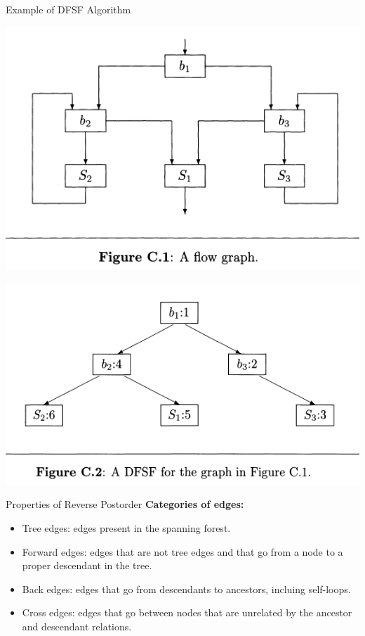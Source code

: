 \documentclass[aspectratio=1610, 13pt]{beamer}
\begin{document}
\begin{frame}{Example of DFSF Algorithm}
\begin{center}
\includegraphics[scale=0.33]{dfsf1.png}

\includegraphics[scale=0.33]{dfsf2.png}
\end{center}
\end{frame}
\begin{frame}{Properties of Reverse Postorder}
\textbf{Categories of edges:}
\begin{itemize}
\item Tree edges: edges present in the spanning forest.
\item Forward edges: edges that are not tree edges and that go from a node to a proper descendant in the tree.
\item Back edges: edges that go from descendants to ancestors, incluing self-loops.
\item Cross edges: edges that go between nodes that are unrelated by the ancestor and descendant relations.
\end{itemize}
\end{frame}
\end{document}
